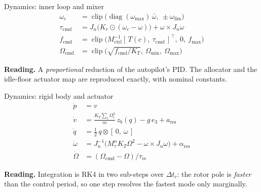 \documentclass[10pt]{beamer}
\newcommand{\takeaway}[1]{\par\vfill{\footnotesize\textbf{Reading.} #1\par}}
\begin{document}
\begin{frame}{Dynamics: inner loop and mixer}
  \small
  \begin{align*}
    \omega_c &= \operatorname{clip}\big(\operatorname{diag}(\omega_{\max})\,
      \bar\omega,\ \pm\omega_{\mathrm{lim}}\big)\\
    \tau_{\mathrm{cmd}} &= J_n\big(K_r\odot(\omega_c-\omega)\big)
      +\omega\times J_n\omega\\
    f_{\mathrm{cmd}} &= \operatorname{clip}\big(M_{\mathrm{ctrl}}^{-1}
      [\,T(c),\ \tau_{\mathrm{cmd}}\,]^{\!\top},\ 0,\ f_{\max}\big)\\
    \Omega_{\mathrm{cmd}} &= \operatorname{clip}\big(
      \sqrt{f_{\mathrm{cmd}}/K_T},\ \Omega_{\min},\ \Omega_{\max}\big)
  \end{align*}
  \normalsize
  \takeaway{A \emph{proportional} reduction of the autopilot's PID. The
    allocator and the idle-floor actuator map are reproduced exactly, with
    nominal constants.}
\end{frame}

\begin{frame}{Dynamics: rigid body and actuator}
  \small
  \begin{align*}
    \dot p &= v\\
    \dot v &= \frac{K_T\sum_i\Omega_i^{2}}{m}\,z_b(q)-g\,e_3+a_{\mathrm{res}}\\
    \dot q &= \tfrac12\,q\otimes[\,0,\ \omega\,]\\
    \dot\omega &= J_n^{-1}\big(M_\tau^{n}K_T\Omega^{2}
      -\omega\times J_n\omega\big)+\alpha_{\mathrm{res}}\\
    \dot\Omega &= (\Omega_{\mathrm{cmd}}-\Omega)/\tau_m
  \end{align*}
  \normalsize
  \takeaway{Integration is RK4 in two sub-steps over $\Delta t_c$: the rotor
    pole is \emph{faster} than the control period, so one step resolves the
    fastest mode only marginally.}
\end{frame}
\end{document}
